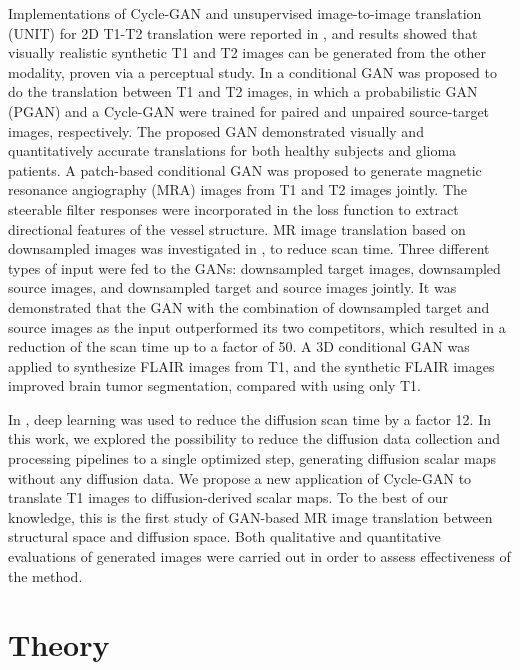 \documentclass{article}
\begin{document}
Implementations of Cycle-GAN and unsupervised image-to-image translation (UNIT) for 2D T1-T2 translation were reported in \cite{welander2018generative}, and results showed that visually realistic synthetic T1 and T2 images can be generated from the other modality, proven via a perceptual study.
In \cite{dar2018image} a conditional GAN  was proposed to do the translation between T1 and T2 images, in which a probabilistic GAN (PGAN) and a Cycle-GAN were trained for paired and unpaired source-target images, respectively. The proposed GAN demonstrated visually and quantitatively accurate translations for both healthy subjects and glioma patients.
A patch-based conditional GAN \cite{olut2018generative} was proposed to generate magnetic resonance angiography (MRA) images from T1 and T2 images jointly. The steerable filter responses were incorporated in the loss function to extract directional features of the vessel structure.
MR image translation based on downsampled images was investigated in \cite{dar2018synergistic}, to reduce scan time. Three different types of input were fed to the GANs: downsampled target images, downsampled source images, and downsampled target and source images jointly. It was demonstrated that the GAN with the combination of downsampled target and source images as the input outperformed its two competitors, which resulted in a reduction of the scan time up to a factor of 50.
A 3D conditional GAN \cite{yu20183d} was applied to synthesize FLAIR images from T1, and the synthetic FLAIR images  improved brain tumor segmentation, compared with using only T1.






In \cite{golkov2015q}, deep learning was used to reduce the diffusion scan time by a factor 12.
In this work, we explored the possibility to reduce the diffusion data collection and processing pipelines to a single optimized step, generating diffusion scalar maps without any diffusion data. We propose a new application of Cycle-GAN \cite{zhu2017unpaired} to translate T1 images to diffusion-derived scalar maps. To the best of our knowledge, this is the first study of GAN-based MR image translation between structural space and diffusion space. Both qualitative and quantitative evaluations of generated images were carried out in order to assess effectiveness of the method.



\section{Theory}
\label{sec:format}
\end{document}
